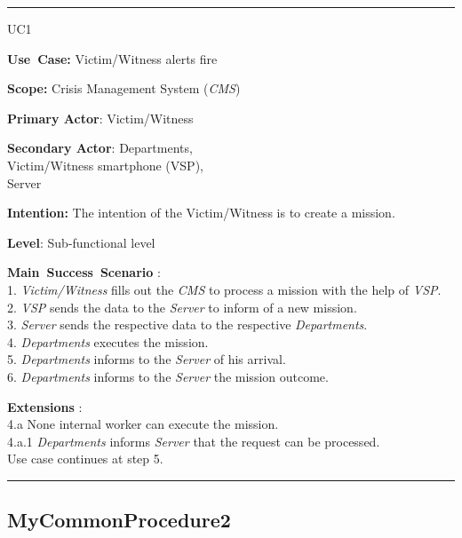 \vspace{0.5cm}
\hrule
\begin{lyxlist}{UC1}
\small{
\item [\textbf{Use~Case:}] Victim/Witness alerts fire
\item [\textbf{Scope:}] Crisis Management System (\emph{CMS})
\item [\textbf{Primary Actor}:] Victim/Witness
\item [\textbf{Secondary Actor}:] Departments,\\
                  Victim/Witness smartphone (VSP),\\
                  Server
\item [\textbf{Intention:}]The intention of the Victim/Witness is to create a
mission.
\item [\textbf{Level}:]Sub-functional level
\item [\textbf{Main~Success~Scenario}]:\\
1. \emph{Victim/Witness} fills out the \emph{CMS} to process a mission with the help
of \emph{VSP}.\\
2. \emph{VSP} sends the data to the \emph{Server} to inform of a new
mission.\\
3. \emph{Server} sends the respective data to the respective
\emph{Departments}.\\
4. \emph{Departments} executes the mission.\\
5. \emph{Departments} informs to the \emph{Server} of his arrival.\\
6. \emph{Departments} informs to the \emph{Server} the mission outcome.


\item [\textbf{Extensions}]:\\
4.a None internal worker can execute the mission.\\
\hspace*{0.5cm} 4.a.1 \emph{Departments} informs \emph{Server} that the request
can be processed.\\
\hspace*{1.4cm} Use case continues at step 5.

}

\end{lyxlist}
\hrule
\vspace{0.5cm}

\subsection{MyCommonProcedure2}

